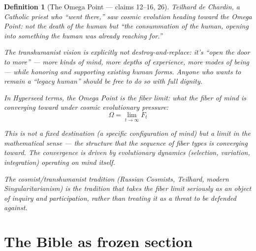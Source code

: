 \documentclass[11pt,a4paper]{article}
\newtheorem{definition}{Definition}[section]
\begin{document}
\begin{definition}[The Omega Point --- claims 12--16, 26]
\label{def:omega}
Teilhard de Chardin, a Catholic priest who ``went there,'' saw cosmic
evolution heading toward the Omega Point: not the death of the human
but ``the consummation of the human, opening into something the human
was already reaching for.''

The transhumanist vision is explicitly \emph{not} destroy-and-replace:
it's ``open the door to more'' --- more kinds of mind, more depths
of experience, more modes of being --- while honoring and supporting
existing human forms. Anyone who wants to remain a ``legacy human''
should be free to do so with full dignity.

In Hyperseed terms, the Omega Point is the \emph{fiber limit}: what
the fiber of mind is converging toward under cosmic evolutionary
pressure:
\[
  \Omega = \lim_{t \to \infty} F_t
\]

This is not a fixed destination (a specific configuration of mind)
but a limit in the mathematical sense --- the structure that the
sequence of fiber types is converging toward. The convergence is
driven by evolutionary dynamics (selection, variation, integration)
operating on mind itself.

The cosmist/transhumanist tradition (Russian Cosmists, Teilhard,
modern Singularitarianism) is the tradition that takes the fiber
limit seriously as an object of inquiry and participation, rather
than treating it as a threat to be defended against.
\end{definition}

\section{The Bible as frozen section}
\label{sec:bible}
\end{document}
